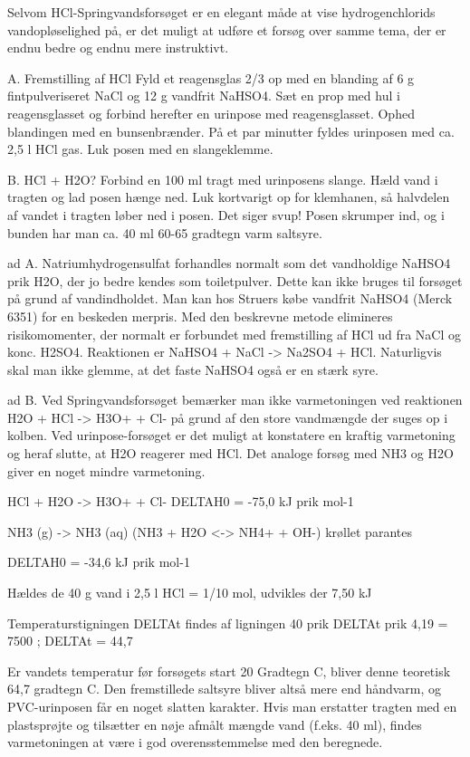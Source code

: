 
\danskkemi{}

Selvom HCl-Springvandsforsøget er en elegant måde at vise hydrogenchlorids
vandopløselighed på, er det muligt at udføre et forsøg over samme tema,
der er endnu bedre og endnu mere instruktivt.

A. Fremstilling af HCl
Fyld et reagensglas 2/3 op med en blanding af 6 g fintpulveriseret NaCl og
12 g vandfrit NaHSO4. Sæt en prop med hul i reagensglasset og forbind
herefter en urinpose med reagensglasset. Ophed blandingen med en bunsenbrænder.
På et par minutter fyldes urinposen med ca. 2,5 l HCl gas. Luk posen med en
slangeklemme.

B. HCl + H2O?
Forbind en 100 ml tragt med urinposens slange. Hæld vand i tragten og lad
posen hænge ned. Luk kortvarigt op for klemhanen, så halvdelen af vandet i
tragten løber ned i posen. Det siger svup! Posen skrumper ind, og i bunden
har man ca. 40 ml 60-65 gradtegn varm saltsyre.

ad A. Natriumhydrogensulfat forhandles normalt som det vandholdige NaHSO4 prik H2O,
der jo bedre kendes som toiletpulver. Dette kan ikke bruges til forsøget på
grund af vandindholdet. Man kan hos Struers købe vandfrit NaHSO4 (Merck 6351)
for en beskeden merpris. Med den beskrevne metode elimineres risikomomenter, der
normalt er forbundet med fremstilling af HCl ud fra NaCl og konc. H2SO4.
Reaktionen er
NaHSO4 + NaCl -> Na2SO4 + HCl.
Naturligvis skal man ikke glemme, at det faste NaHSO4 også er en stærk syre.

ad B. Ved Springvandsforsøget bemærker man ikke varmetoningen ved reaktionen
H2O + HCl -> H3O+ + Cl-
på grund af den store vandmængde der suges op i kolben. Ved urinpose-forsøget
er det muligt at konstatere en kraftig varmetoning og heraf slutte, at H2O reagerer
med HCl. Det analoge forsøg med NH3 og H2O giver en noget mindre varmetoning.

HCl + H2O -> H3O+ + Cl-
DELTAH0 = -75,0 kJ prik mol-1

NH3 (g) -> NH3 (aq)
(NH3 + H2O <-> NH4+ + OH-)   krøllet parantes

DELTAH0 = -34,6 kJ prik mol-1

Hældes de 40 g vand i 2,5 l HCl = 1/10 mol, udvikles der 7,50 kJ

Temperaturstigningen DELTAt findes af ligningen
40 prik DELTAt prik 4,19 = 7500 ; DELTAt = 44,7

Er vandets temperatur før forsøgets start 20 Gradtegn C, bliver denne teoretisk
64,7 gradtegn C. Den fremstillede saltsyre bliver altså mere end håndvarm, og
PVC-urinposen får en noget slatten karakter. Hvis man erstatter tragten med en
plastsprøjte og tilsætter en nøje afmålt mængde vand (f.eks. 40 ml), findes
varmetoningen at være i god overensstemmelse med den beregnede.
